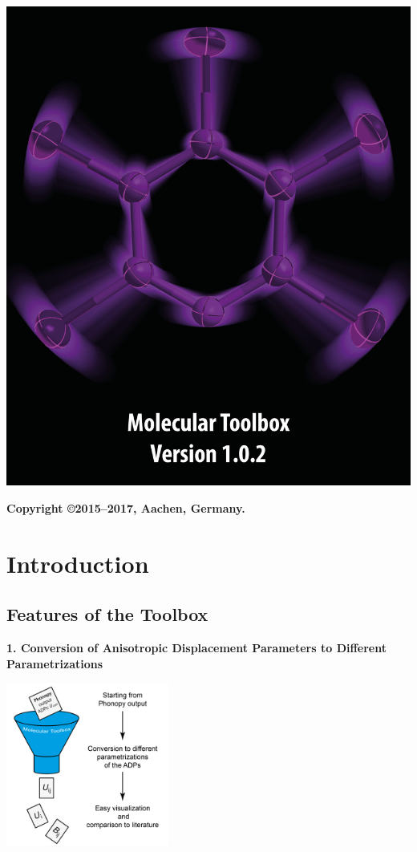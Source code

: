\documentclass[12pt,a4paper]{article}
\begin{document}
		\centering \includegraphics[width=1.0\textwidth]{Unbenannt-1-01.png}
		\vfill
\raggedright\textbf{\Large Copyright \copyright 2015--2017, Aachen, Germany.}
\vfill
\newpage




\tableofcontents
\newpage
{}


\section{Introduction}
\subsection{Features of the Toolbox}


\textbf{1. Conversion of Anisotropic Displacement Parameters to Different Parametrizations}\\
\begin{center}\includegraphics[width=0.4\textwidth]{Piktogramm-01.png}\end{center}
\end{document}
